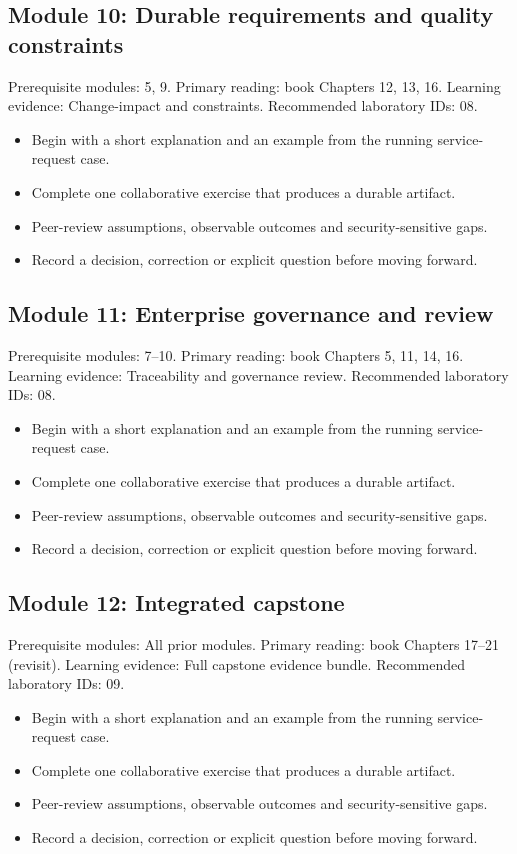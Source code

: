 \documentclass[11pt,letterpaper]{article}
\begin{document}
\subsection{Module 10: Durable requirements and quality constraints}
Prerequisite modules: 5, 9. Primary reading: book Chapters 12, 13, 16. Learning evidence: Change-impact and constraints. Recommended laboratory IDs: 08.

\begin{itemize}[leftmargin=*,itemsep=2pt]
\item Begin with a short explanation and an example from the running service-request case.
\item Complete one collaborative exercise that produces a durable artifact.
\item Peer-review assumptions, observable outcomes and security-sensitive gaps.
\item Record a decision, correction or explicit question before moving forward.
\end{itemize}
\subsection{Module 11: Enterprise governance and review}
Prerequisite modules: 7–10. Primary reading: book Chapters 5, 11, 14, 16. Learning evidence: Traceability and governance review. Recommended laboratory IDs: 08.

\begin{itemize}[leftmargin=*,itemsep=2pt]
\item Begin with a short explanation and an example from the running service-request case.
\item Complete one collaborative exercise that produces a durable artifact.
\item Peer-review assumptions, observable outcomes and security-sensitive gaps.
\item Record a decision, correction or explicit question before moving forward.
\end{itemize}
\subsection{Module 12: Integrated capstone}
Prerequisite modules: All prior modules. Primary reading: book Chapters 17–21 (revisit). Learning evidence: Full capstone evidence bundle. Recommended laboratory IDs: 09.

\begin{itemize}[leftmargin=*,itemsep=2pt]
\item Begin with a short explanation and an example from the running service-request case.
\item Complete one collaborative exercise that produces a durable artifact.
\item Peer-review assumptions, observable outcomes and security-sensitive gaps.
\item Record a decision, correction or explicit question before moving forward.
\end{itemize}
\end{document}
